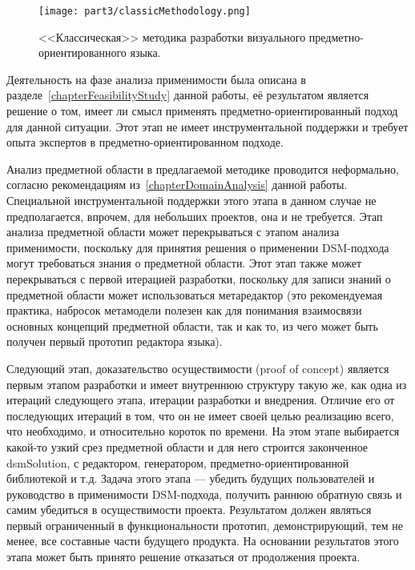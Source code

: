 \begin{figure} [ht]
	\begin{center}
		\texttt{[image: part3/classicMethodology.png]}
		\caption{<<Классическая>> методика разработки визуального предметно-ориентированного языка.}
		\label{classicMethodology}
	\end{center}
\end{figure}

Деятельность на фазе анализа применимости была описана в разделе~\ref{chapterFeasibilityStudy} 
данной работы, её результатом является решение о том, имеет ли смысл применять предметно-ориентированный 
подход для данной ситуации. Этот этап не имеет инструментальной поддержки и требует 
опыта экспертов в предметно-ориентированном подходе.

Анализ предметной области в предлагаемой методике проводится неформально, согласно 
рекомендациям из~\ref{chapterDomainAnalysis} данной работы. Специальной инструментальной 
поддержки этого этапа в данном случае не предполагается, впрочем, для небольших проектов, 
она и не требуется. Этап анализа предметной области может перекрываться с этапом анализа 
применимости, поскольку для принятия решения о применении \ac{DSM}-подхода могут требоваться 
знания о предметной области. Этот этап также может перекрываться с первой итерацией 
разработки, поскольку для записи знаний о предметной области может использоваться 
метаредактор (это рекомендуемая практика, набросок метамодели полезен как для понимания 
взаимосвязи основных концепций предметной области, так и как то, из чего может быть 
получен первый прототип редактора языка).

Следующий этап, доказательство осуществимости (proof of concept) является первым этапом 
разработки и имеет внутреннюю структуру такую же, как одна из итераций следующего этапа, 
итерации разработки и внедрения. Отличие его от последующих итераций в том, что он не 
имеет своей целью реализацию всего, что необходимо, и относительно короток по времени. 
На этом этапе выбирается какой-то узкий срез предметной области и для него строится 
законченное \ac{dsmSolution}, с редактором, генератором, предметно-ориентированной библиотекой 
и т.д. Задача этого этапа --- убедить будущих пользователей и руководство в применимости 
\ac{DSM}-подхода, получить раннюю обратную связь и самим убедиться в осуществимости проекта. 
Результатом должен являться первый ограниченный в функциональности прототип, демонстрирующий, 
тем не менее, все составные части будущего продукта. На основании результатов этого 
этапа может быть принято решение отказаться от продолжения проекта.

